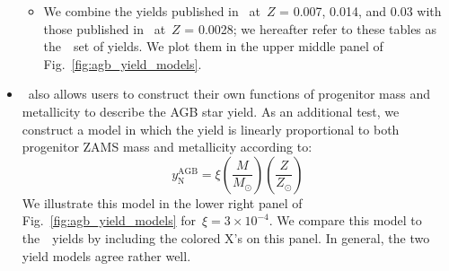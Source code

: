 \documentclass[ms.tex]{subfiles}
\begin{document}
\begin{itemize}
\begin{itemize}
		\item We combine the yields published in~\citet{Karakas2016} at~$Z$ = 
		0.007, 0.014, and 0.03 with those published in~\citet{Karakas2018} 
		at~$Z$ = 0.0028; we hereafter refer to these tables as the~\karakas~set 
		of yields. 
		We plot them in the upper middle panel of 
		Fig.~\ref{fig:agb_yield_models}. 
	\end{itemize} 

	\item \vice~also allows users to construct their own functions of 
	progenitor mass and metallicity to describe the AGB star yield. 
	As an additional test, we construct a model in which the yield is linearly 
	proportional to both progenitor ZAMS mass and metallicity according to: 
	\begin{equation} 
	y_\text{N}^\text{AGB} = \xi\left(\frac{M}{M_\odot}\right) 
	\left(\frac{Z}{Z_\odot}\right) 
	\label{eq:linear_yield} 
	\end{equation} 
	We illustrate this model in the lower right panel of 
	Fig.~\ref{fig:agb_yield_models} for~$\xi = 3\times10^{-4}$. 
	We compare this model to the~\cristallo~yields by including the colored X's 
	on this panel. 
	In general, the two yield models agree rather well. 
\end{itemize}
\end{document}
